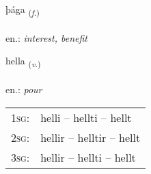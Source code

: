 \documentclass[frontgrid, backgrid]{flacards}\usepackage[]{graphicx}\usepackage[]{xcolor}
\begin{document}
\renewcommand{\flhead}{\vskip5pt \fboxsep=0pt {\small\bfseries\footnotesize Nafnorð | Noun}}
\renewcommand{\fcfoot}{\vskip5pt \fboxsep=0pt \hspace{2pt}{\small\bfseries\footnotesize 2K}}

\renewcommand{\blhead}{\vskip5pt {\small\bfseries\footnotesize Nafnorð | Noun }}
\renewcommand{\bcfoot}{\vskip5pt \hspace{2pt}{\small\bfseries\footnotesize 2K}}


{þága \small{\textsubscript{(\textit{f.})}} \\[1ex] %
\textphonetic{[θauːɣa]} \\
en.: \emph{interest, benefit} \\  [2ex]
\renewcommand*{\arraystretch}{0.8}
}

\renewcommand{\flhead}{\vskip5pt \fboxsep=0pt {\small\bfseries\footnotesize Sagnorð | Verb}}
\renewcommand{\fcfoot}{\vskip5pt \fboxsep=0pt \hspace{2pt}{\small\bfseries\footnotesize 2K}}

\renewcommand{\blhead}{\vskip5pt {\small\bfseries\footnotesize Sagnorð | Verb }}
\renewcommand{\bcfoot}{\vskip5pt \hspace{2pt}{\small\bfseries\footnotesize 2K}}


{hella \small{\textsubscript{(\textit{v.})}} \\[1ex] %
\textphonetic{[hɛtla]} \\
en.: \emph{pour} \\  [2ex]
\renewcommand*{\arraystretch}{0.8}
\begin{tabular}{p{1cm}l}
\textsc{1sg}: & helli -- hellti -- hellt \\ 
\textsc{2sg}: & hellir -- helltir -- hellt \\ 
\textsc{3sg}: & hellir -- hellti -- hellt \\ 
\end{tabular}
}
\end{document}
